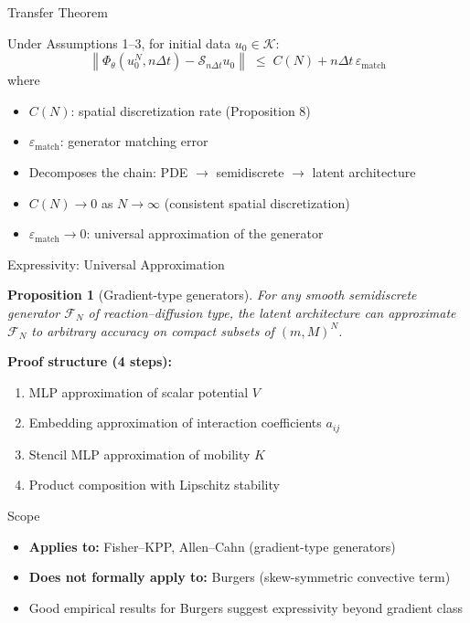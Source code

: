 \documentclass[aspectratio=169, 11pt]{beamer}
\newtheorem{proposition}{Proposition}
\newcommand{\cK}{\mathcal{K}}
\newcommand{\cS}{\mathcal{S}}
\newcommand{\cFN}{\mathcal{F}_N}
\newcommand{\PhiT}{\Phi_{\theta}}
\newcommand{\norm}[1]{\left\lVert #1 \right\rVert}
\begin{document}
\begin{frame}{Transfer Theorem}

\begin{theorem}
Under Assumptions 1--3, for initial data $u_0 \in \cK$:
\[
\norm{\PhiT(u_0^N, n\Delta t) - \cS_{n\Delta t} u_0}
\;\leq\;
C(N) + n\Delta t\,\varepsilon_{\mathrm{match}}
\]
where
\begin{itemize}
    \item $C(N)$: spatial discretization rate (Proposition 8)
    \item $\varepsilon_{\mathrm{match}}$: generator matching error
\end{itemize}
\end{theorem}

\vspace{0.2cm}
\begin{itemize}
    \item Decomposes the chain: PDE $\to$ semidiscrete $\to$ latent architecture
    \item $C(N) \to 0$ as $N \to \infty$ (consistent spatial discretization)
    \item $\varepsilon_{\mathrm{match}} \to 0$: universal approximation of the generator
\end{itemize}
\end{frame}

\begin{frame}{Expressivity: Universal Approximation}

\begin{proposition}[Gradient-type generators]
For any smooth semidiscrete generator $\cFN$ of reaction--diffusion type, the latent architecture can approximate $\cFN$ to arbitrary accuracy on compact subsets of $(m,M)^N$.
\end{proposition}

\vspace{0.2cm}
\textbf{Proof structure (4 steps):}
\begin{enumerate}
    \item MLP approximation of scalar potential $V$
    \item Embedding approximation of interaction coefficients $a_{ij}$
    \item Stencil MLP approximation of mobility $K$
    \item Product composition with Lipschitz stability
\end{enumerate}

\vspace{0.2cm}
\begin{block}{Scope}
\begin{itemize}
    \item \textbf{Applies to:} Fisher--KPP, Allen--Cahn (gradient-type generators)
    \item \textbf{Does not formally apply to:} Burgers (skew-symmetric convective term)
    \item Good empirical results for Burgers suggest expressivity beyond gradient class
\end{itemize}
\end{block}
\end{frame}
\end{document}
